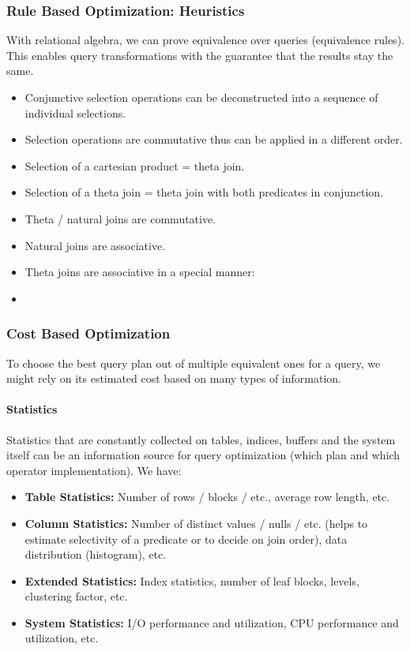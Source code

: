 \subsubsection{Rule Based Optimization: Heuristics}

With relational algebra, we can prove equivalence over queries (equivalence rules). This enables query transformations with the guarantee that the results stay the same.


\begin{itemize}
    \item Conjunctive selection operations can be deconstructed into a sequence of individual selections.
    \item Selection operations are commutative thus can be applied in a different order.
    \item Selection of a cartesian product = theta join.
    \item Selection of a theta join = theta join with both predicates in conjunction.
    \item Theta / natural joins are commutative.
    \item Natural joins are associative.
    \item Theta joins are associative in a special manner: %
    \item %
\end{itemize}


\subsubsection{Cost Based Optimization}

To choose the best query plan out of multiple equivalent ones for a query, we might rely on its estimated cost based on many types of information.

\paragraph{Statistics}
Statistics that are constantly collected on tables, indices, buffers and the system itself can be an information source for query optimization (which plan and which operator implementation). We have:

\begin{itemize}
    \item \textbf{Table Statistics:} Number of rows / blocks / etc., average row length, etc.
    \item \textbf{Column Statistics:} Number of distinct values / nulls / etc. (helps to estimate selectivity of a predicate or to decide on join order), data distribution (histogram), etc.
    \item \textbf{Extended Statistics:} Index statistics, number of leaf blocks, levels, clustering factor, etc.
    \item \textbf{System Statistics:} I/O performance and utilization, CPU performance and utilization, etc.
\end{itemize}


